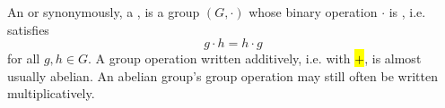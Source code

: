 \begin{definition}[Groups]
    An  or synonymously, a , is a group $(G,\cdot)$ whose binary operation $\cdot$ is , i.e. satisfies 
    $$g \cdot h = h \cdot g$$
    for all $g,h \in G$. A group operation written additively, i.e. with \hl{$+$}, is almost usually abelian. An abelian group's group operation may still often be written multiplicatively.



\end{definition}

